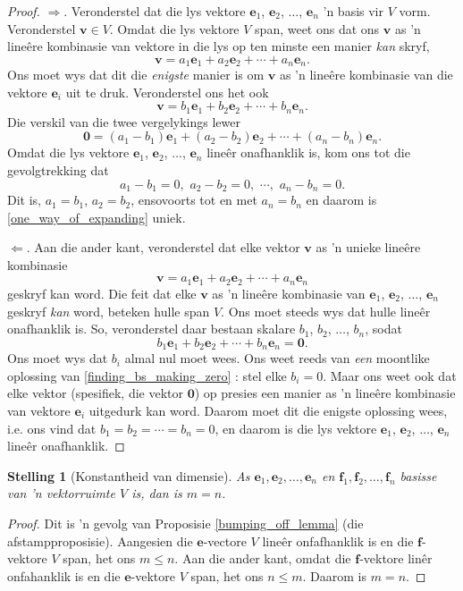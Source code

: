\documentclass[a4paper,11pt]{book}
\newtheorem{theorem}{Stelling}
\theoremstyle{definition}
\newcommand{\be}{\begin{equation}}
\newcommand{\ee}{\end{equation}}
\newcommand{\ve}[1]{\mathbf{#1}}
\begin{document}
\begin{proof} $\Rightarrow$. Veronderstel dat die lys vektore $\ve{e}_1$,
	$\ve{e}_2$, $\ldots$, $\ve{e}_n$ 'n basis vir $V$ vorm. Veronderstel
	$\ve{v} \in V$. Omdat die lys vektore $V$ span, weet ons dat ons
	$\ve{v}$ as 'n line{\^e}re kombinasie van vektore in die lys op ten
	minste een manier \emph{kan} skryf, 
	\be \label{one_way_of_expanding}
	\ve{v} = a_1 \ve{e}_1 + a_2 \ve{e}_2 + \cdots + a_n \ve{e}_n.
	\ee
	Ons moet wys dat dit die \emph{enigste} manier is om $\ve{v}$ as 'n
	line{\^e}re kombinasie van die vektore $\ve{e}_i$ uit te druk.
	Veronderstel ons het ook
	\be \label{second_way_of_expanding}
	\ve{v} = b_1 \ve{e}_1 + b_2 \ve{e}_2 + \cdots + b_n \ve{e}_n.
	\ee
	Die verskil van die twee vergelykings lewer
	\[
		\ve{0} = (a_1 - b_1) \ve{e}_1 + (a_2 - b_2) \ve{e}_2 + \cdots +
		(a_n - b_n) \ve{e}_n.
	\]
	Omdat die lys vektore  $\ve{e}_1$, $\ve{e}_2$, $\ldots$, $\ve{e}_n$
	line{\^e}r onafhanklik is, kom ons tot die gevolgtrekking dat
	\[
		a_1 - b_1 = 0, \,\, a_2 - b_2 = 0, \,\, \cdots, \,\, a_n - b_n =
		0.
	\]
	Dit is, $a_1 = b_1$, $a_2 = b_2$, ensovoorts tot en met $a_n = b_n$ en
	daarom is \eqref{one_way_of_expanding} uniek.

	$\Leftarrow$. Aan die ander kant, veronderstel dat elke vektor $\ve{v}$
	as 'n unieke line{\^e}re kombinasie
	\[
		\ve{v} = a_1 \ve{e}_1 + a_2 \ve{e}_2 + \cdots + a_n \ve{e}_n
	\]
	geskryf kan word. Die feit dat elke $\ve{v}$ as 'n line{\^e}re
	kombinasie van $\ve{e}_1$, $\ve{e}_2$, $\ldots$, $\ve{e}_n$ geskryf
	\emph{kan} word, beteken hulle span $V$. Ons moet steeds wys dat hulle
	line{\^e}r onafhanklik is.  So, veronderstel daar bestaan skalare
	$b_1$, $b_2$, $\ldots$, $b_n$, sodat
	\be \label{finding_bs_making_zero}
	b_1 \ve{e}_1 + b_2 \ve{e}_2 + \cdots + b_n \ve{e}_n = \ve{0}.
	\ee
	Ons moet wys dat $b_i$ almal nul moet wees. Ons weet reeds van
	\emph{een} moontlike oplossing van \eqref{finding_bs_making_zero} :
	stel elke $b_i = 0$. Maar ons weet ook dat elke vektor (spesifiek, die
	vektor $\ve{0}$) op presies een manier as 'n line{\^e}re kombinasie van
	vektore $\ve{e}_i$ uitgedurk kan word. Daarom moet dit die enigste
	oplossing wees, i.e. ons vind dat $b_1 = b_2 = \cdots = b_n = 0$, en
	daarom is die lys vektore $\ve{e}_1$, $\ve{e}_2$, $\ldots$, $\ve{e}_n$
	line{\^e}r onafhanklik.
\end{proof}

\begin{theorem}[Konstantheid van dimensie] \label{inv_dim} As $\ve{e}_1,
	\ve{e}_2, \ldots, \ve{e}_n$ en $\ve{f}_1, \ve{f}_2, \ldots, \ve{f}_n$
	basisse van 'n vektorruimte $V$ is, dan is $m=n$.
\end{theorem}
\begin{proof}
	Dit is 'n gevolg van Proposisie \ref{bumping_off_lemma} (die
	afstampproposisie). Aangesien die $\ve{e}$-vectore $V$ line{\^e}r
	onfafhanklik is en 	die $\ve{f}$-vektore $V$ span, het ons $m \leq n$.
	Aan die ander kant, omdat die $\ve{f}$-vektore lin{\^e}r onfahanklik is
	en die $\ve{e}$-vektore $V$ span, het ons $n \leq m$. Daarom is $m=n$.
\end{proof}
\end{document}
